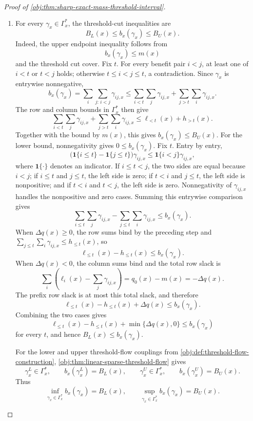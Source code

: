 \documentclass[11pt]{article}
\begin{document}
\begin{proof}[Proof of \cref{obj:thm:sharp-exact-mass-threshold-interval}]
\begin{enumerate}
\item For every \(\gamma_x\in\Gamma_x^\ast\), the threshold-cut inequalities are
\[
B_L(x)\le b_x(\gamma_x)\le B_U(x).
\]
Indeed, the upper endpoint inequality follows from
\[
b_x(\gamma_x)
\le m(x)
\]
and the threshold cut cover.  Fix \(t\).  For every benefit pair \(i<j\), at least one of \(i<t\) or \(t<j\) holds; otherwise \(t\le i<j\le t\), a contradiction.  Since \(\gamma_x\) is entrywise nonnegative,
\[
b_x(\gamma_x)
=
\sum_i\sum_{j:\,i<j}\gamma_{ij,x}
\le
\sum_{i<t}\sum_j\gamma_{ij,x}
+
\sum_{j>t}\sum_i\gamma_{ij,x}.
\]
The row and column bounds in \(\Gamma_x^\ast\) then give
\[
\sum_{i<t}\sum_j\gamma_{ij,x}
+
\sum_{j>t}\sum_i\gamma_{ij,x}
\le
\ell_{<t}(x)+h_{>t}(x).
\]
Together with the bound by \(m(x)\), this gives \(b_x(\gamma_x)\le B_U(x)\).  For the lower bound, nonnegativity gives \(0\le b_x(\gamma_x)\).  Fix \(t\).  Entry by entry,
\[
\bigl(\mathbf 1\{i\le t\}-\mathbf 1\{j\le t\}\bigr)\gamma_{ij,x}
\le
\mathbf 1\{i<j\}\gamma_{ij,x},
\]
where \(\mathbf 1\{\cdot\}\) denotes an indicator.  If \(i\le t<j\), the two sides are equal because \(i<j\); if \(i\le t\) and \(j\le t\), the left side is zero; if \(t<i\) and \(j\le t\), the left side is nonpositive; and if \(t<i\) and \(t<j\), the left side is zero.  Nonnegativity of \(\gamma_{ij,x}\) handles the nonpositive and zero cases.  Summing this entrywise comparison gives
\[
\sum_{i\le t}\sum_j\gamma_{ij,x}
-
\sum_{j\le t}\sum_i\gamma_{ij,x}
\le b_x(\gamma_x).
\]
When \(\Delta q(x)\ge0\), the row sums bind by the preceding step and
\(\sum_{j\le t}\sum_i\gamma_{ij,x}\le h_{\le t}(x)\), so
\[
\ell_{\le t}(x)-h_{\le t}(x)\le b_x(\gamma_x).
\]
When \(\Delta q(x)<0\), the column sums bind and the total row slack is
\[
\sum_i\left(\ell_i(x)-\sum_j\gamma_{ij,x}\right)=q_0(x)-m(x)=-\Delta q(x).
\]
The prefix row slack is at most this total slack, and therefore
\[
\ell_{\le t}(x)-h_{\le t}(x)+\Delta q(x)\le b_x(\gamma_x).
\]
Combining the two cases gives
\[
\ell_{\le t}(x)-h_{\le t}(x)+\min\{\Delta q(x),0\}\le b_x(\gamma_x)
\]
for every \(t\), and hence \(B_L(x)\le b_x(\gamma_x)\).

For the lower and upper threshold-flow couplings from
\cref{obj:def:threshold-flow-construction}, \cref{obj:thm:linear-sparse-threshold-flow} gives
\[
\gamma_x^L\in\Gamma_x^\ast,\qquad b_x(\gamma_x^L)=B_L(x),
\qquad
\gamma_x^U\in\Gamma_x^\ast,\qquad b_x(\gamma_x^U)=B_U(x).
\]
Thus
\[
\inf_{\gamma_x\in\Gamma_x^\ast}b_x(\gamma_x)=B_L(x),
\qquad
\sup_{\gamma_x\in\Gamma_x^\ast}b_x(\gamma_x)=B_U(x).
\] %


\end{enumerate}
\end{proof}
\end{document}
